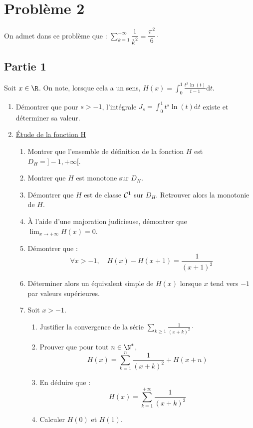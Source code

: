 \documentclass[twoside,french,11pt]{VcCours}
\newcommand{\dt}{\text{d}t}
\begin{document}
\section*{Problème 2}

On admet dans ce problème que : $\sum_{k=1}^{+ \infty} \dfrac{1}{k^2} = \dfrac{\pi^2}{6} \cdot$

\subsection*{Partie 1}
Soit $x\in \R$. On note, lorsque cela a un sens, $H(x)=\int_0^1\frac{t^x\ln(t)}{t-1}\dt$.
\begin{enumerate}
\item Démontrer que pour $s>-1$, l'intégrale $J_s=\int_0^1t^s\ln(t)\dt$ existe et déterminer sa valeur.
\item \underline{Étude de la fonction H}
\begin{enumerate}
\item Montrer que l'ensemble de définition de la fonction $H$ est $D_H=]-1,+\infty[$.
\item Montrer que $H$ est monotone sur $D_H$.
\item Démontrer que $H$ est de classe ${\cal C}^1$ sur $D_H$. Retrouver alors la monotonie de $H$.
\item À l'aide d'une majoration judicieuse, démontrer que $\lim_{x\to +\infty}H(x)=0$.
\item Démontrer que :
\[\forall x>-1,\quad H(x)-H(x+1)=\frac{1}{(x+1)^2}\]
\item Déterminer alors un équivalent simple de $H(x)$ lorsque $x$ tend vers $-1$ par valeurs supérieures.
\item Soit $x>-1$.
\begin{enumerate}
\item Justifier la convergence de la série $\sum_{k\geq 1}\frac{1}{(x+k)^2} \cdot$
\item Prouver que pour tout $n\in \N^*$, 
\[H(x)=\sum_{k=1}^n\frac{1}{(x+k)^2}+H(x+n)\]
\item En déduire que :
\[H(x)=\sum_{k=1}^{+ \infty} \frac{1}{(x+k)^2}\]
\item Calculer $H(0)$ et $H(1)$.
\end{enumerate}
\end{enumerate}
\end{enumerate}
\end{document}
